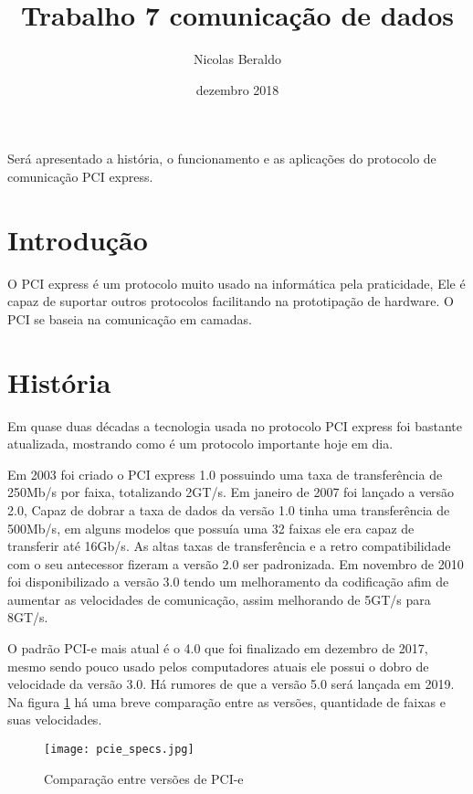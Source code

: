 \documentclass{article}
\title{Trabalho 7 comunicação de dados}
\author{Nicolas Beraldo}
\date{dezembro 2018}
\begin{document}
    \maketitle
        \begin{center}
            Será apresentado a história, o funcionamento e as aplicações do protocolo de comunicação PCI express. 
        \end{center}
        
    \section*{Introdução}
        O PCI express é um protocolo muito usado na informática pela praticidade, Ele é capaz de suportar outros protocolos facilitando na prototipação de hardware. O PCI se baseia na comunicação em camadas.
        
    \section{História}
        Em quase duas décadas a tecnologia usada no protocolo PCI express foi bastante atualizada, mostrando como é um protocolo importante hoje em dia.
        
        Em 2003 foi criado o PCI express 1.0 possuindo uma taxa de transferência de 250Mb/s por faixa, totalizando 2GT/s. Em janeiro de 2007 foi lançado a versão 2.0, Capaz de dobrar a taxa de dados da versão 1.0 tinha uma transferência de 500Mb/s, em alguns modelos que possuía uma 32 faixas ele era capaz de transferir até 16Gb/s. As altas taxas de transferência e a retro compatibilidade com o seu antecessor fizeram a versão 2.0 ser padronizada. Em novembro de 2010 foi disponibilizado a versão 3.0 tendo um melhoramento da codificação afim de aumentar as velocidades de comunicação, assim melhorando de 5GT/s para 8GT/s.
        
        O padrão PCI-e mais atual é o 4.0 que foi finalizado em dezembro de 2017, mesmo sendo pouco usado pelos computadores atuais ele possui o dobro de velocidade da versão 3.0. Há rumores de que a versão 5.0 será lançada em 2019. Na figura \ref{fig:versoes} há uma breve comparação entre as versões, quantidade de faixas e suas velocidades.
        \begin{figure}[H]
            \centering
            \texttt{[image: pcie\_specs.jpg]}
            \caption{Comparação entre versões de PCI-e}
            \label{fig:versoes}
        \end{figure}
        
\end{document}
